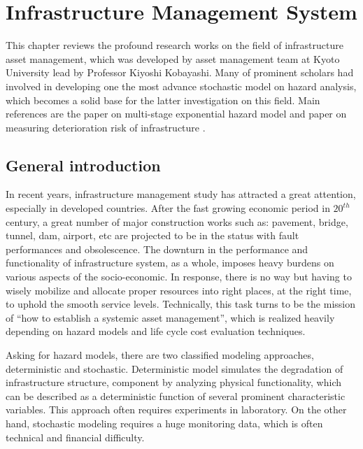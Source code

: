 
\chapter{Infrastructure Management System} %
\label{Chapter2}
This chapter reviews the profound research works on the field of infrastructure asset management, which was developed by asset management team at Kyoto University lead by Professor Kiyoshi Kobayashi. Many of prominent scholars had involved in developing one the most advance stochastic model on hazard analysis, which becomes a solid base for the latter investigation on this field. Main references are the paper on multi-stage exponential hazard model \cite{kobayashitsuda} and paper on measuring deterioration risk of infrastructure \cite{aokib}.
\section{General introduction}
\label{21}
In recent years, infrastructure management study has attracted a great attention, especially in developed countries. After the fast growing economic period in $20^{th}$ century, a great number of major construction works such as: pavement, bridge, tunnel, dam, airport, etc are projected to be in the status with fault performances and obsolescence. The downturn in the performance and functionality of infrastructure system, as a whole, imposes heavy burdens on various aspects of the socio-economic. In response, there is no way but having to wisely mobilize and allocate proper resources into right places, at the right time, to uphold the smooth service levels. Technically, this task turns to be the mission of ``how to establish a systemic asset management'', which is realized heavily depending on hazard models and life cycle cost evaluation techniques.

Asking for hazard models, there are two classified modeling approaches, deterministic and stochastic. Deterministic model simulates the degradation of infrastructure structure, component by analyzing physical functionality, which can be described as a deterministic function of several prominent characteristic variables. This approach often requires experiments in laboratory. On the other hand, stochastic modeling requires a huge monitoring data, which is often technical and financial difficulty.

